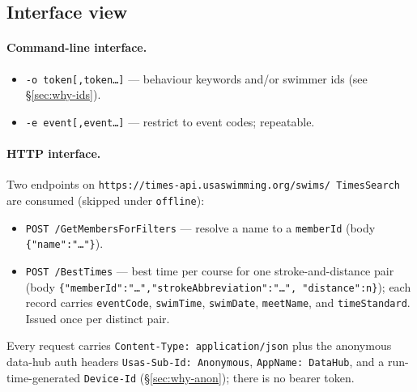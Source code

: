 \documentclass[12pt]{article}
\newcommand{\code}[1]{\texttt{#1}}
\begin{document}
\subsection{Interface view}

\paragraph{Command-line interface.}
\begin{itemize}
  \item \code{-o token[,token\ldots]} --- behaviour keywords and/or
        swimmer ids (see \S\ref{sec:why-ids}).
  \item \code{-e event[,event\ldots]} --- restrict to event codes;
        repeatable.
\end{itemize}

\paragraph{HTTP interface.}
Two endpoints on \code{https://times-api.usaswimming.org/swims/%
TimesSearch} are consumed (skipped under \code{offline}):
\begin{itemize}
  \item \code{POST /GetMembersForFilters} --- resolve a name to a
        \code{memberId} (body \code{\{"name":"\dots"\}}).
  \item \code{POST /BestTimes} --- best time per course for one
        stroke-and-distance pair (body
        \code{\{"memberId":"\dots","strokeAbbreviation":"\dots",%
        "distance":n\}}); each record carries \code{eventCode},
        \code{swimTime}, \code{swimDate}, \code{meetName}, and
        \code{timeStandard}.  Issued once per distinct pair.
\end{itemize}

Every request carries \code{Content-Type: application/json} plus the
anonymous data-hub auth headers \code{Usas-Sub-Id: Anonymous},
\code{AppName: DataHub}, and a run-time-generated \code{Device-Id}
(\S\ref{sec:why-anon}); there is no bearer token.
\end{document}
